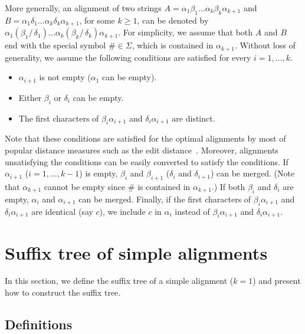 \documentclass{llncs}
\newcommand{\partitle}[1]{}                        \newcommand{\commentout}[1]{}
\newcommand{\bi}{\begin{itemize}}
\newcommand{\ei}{\end{itemize}}
\begin{document}
More generally, an alignment of two strings
 $A=\alpha_1 \beta_1 \ldots \alpha_k \beta_k \alpha_{k+1}$ and
 $B= \alpha_1 \delta_1 \ldots \alpha_k \delta_k \alpha_{k+1}$, for some $k\ge 1$,
 can be denoted by
 $\alpha_1 (\beta_1 /\, \delta_1) \ldots \alpha_k (\beta_k /\, \delta_k) \alpha_{k+1}$.
For simplicity, we assume that
 both $A$ and $B$ end with the special symbol $\# \in \Sigma$,
 which is contained in $\alpha_{k+1}$.
Without loss of generality,
 we assume the following conditions are satisfied
 for every $i=1,\ldots, k$.
\bi
\item $\alpha_{i+1}$ is not empty ($\alpha_1$ can be empty).
\item Either $\beta_i$ or $\delta_i$ can be empty.
\item The first characters of $\beta_i\alpha_{i+1}$ and $\delta_i\alpha_{i+1}$
       are distinct.
\ei
Note that these conditions are satisfied for the optimal alignments
 by most of popular distance measures such as the edit distance~\cite{Levenshtein:66}.
Moreover, alignments unsatisfying the conditions
 can be easily converted to satisfy the conditions.
If $\alpha_{i+1}$ ($i=1,\ldots,k-1$) is empty,
 $\beta_{i}$ and $\beta_{i+1}$ ($\delta_{i}$ and $\delta_{i+1}$) can be merged.
 (Note that $\alpha_{k+1}$ cannot be empty since $\#$ is contained in $\alpha_{k+1}$.)
If both $\beta_i$ and $\delta_i$ are empty,
 $\alpha_{i}$ and $\alpha_{i+1}$ can be merged.
Finally, if the first characters of $\beta_i\alpha_{i+1}$ and $\delta_i\alpha_{i+1}$
       are identical (say $c$),
 we include $c$ in $\alpha_i$ instead of $\beta_i\alpha_{i+1}$ and $\delta_i\alpha_{i+1}$.




\section{Suffix tree of simple alignments}
\label{sec:ST-simple-A}



\partitle{Intro.}

In this section,
 we define the suffix tree of a simple alignment ($k=1$)
 and present how to construct the suffix tree.



\subsection{Definitions}
\label{subsec:def-simple}



\partitle{a-suffix}
\end{document}
